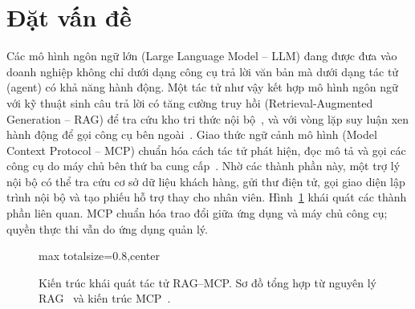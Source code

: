 \documentclass[../DoAn.tex]{subfiles}
\begin{document}
\section{Đặt vấn đề}
\label{section:1.1}
Các mô hình ngôn ngữ lớn (Large Language Model -- LLM) đang được đưa vào doanh nghiệp không chỉ dưới dạng công cụ trả lời văn bản mà dưới dạng tác tử (agent) có khả năng hành động. Một tác tử như vậy kết hợp mô hình ngôn ngữ với kỹ thuật sinh câu trả lời có tăng cường truy hồi (Retrieval-Augmented Generation -- RAG) để tra cứu kho tri thức nội bộ~\cite{lewis2020rag}, và với vòng lặp suy luận xen hành động để gọi công cụ bên ngoài~\cite{yao2023react}. Giao thức ngữ cảnh mô hình (Model Context Protocol -- MCP) chuẩn hóa cách tác tử phát hiện, đọc mô tả và gọi các công cụ do máy chủ bên thứ ba cung cấp~\cite{anthropic2024mcp}. Nhờ các thành phần này, một trợ lý nội bộ có thể tra cứu cơ sở dữ liệu khách hàng, gửi thư điện tử, gọi giao diện lập trình nội bộ và tạo phiếu hỗ trợ thay cho nhân viên.
Hình~\ref{fig:c1-rag-mcp} khái quát các thành phần liên quan. MCP chuẩn hóa trao đổi giữa ứng dụng và máy chủ công cụ; quyền thực thi vẫn do ứng dụng quản lý.
\begin{figure}[htbp]
\centering
\begin{adjustbox}{max totalsize={\linewidth}{0.8\textheight},center}
\end{adjustbox}
\caption[Kiến trúc khái quát tác tử RAG--MCP]{Kiến trúc khái quát tác tử RAG--MCP. Sơ đồ tổng hợp từ nguyên lý RAG~\cite{lewis2020rag} và kiến trúc MCP~\cite{mcp2025spec}.}
\label{fig:c1-rag-mcp}
\end{figure}
\end{document}
